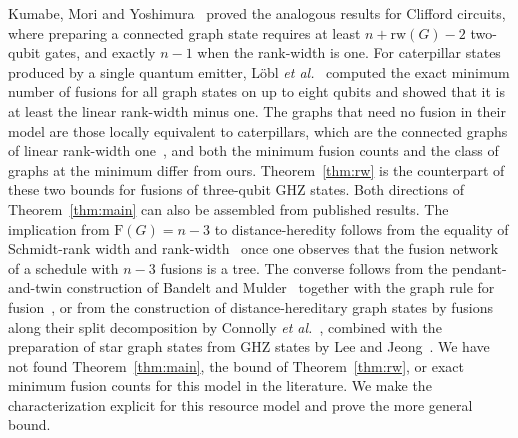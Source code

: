 \documentclass[aps,pra,onecolumn,superscriptaddress,nofootinbib,longbibliography]{revtex4-2}
\theoremstyle{plain}
\theoremstyle{remark}
\newcommand{\F}{\mathrm{F}}
\newcommand{\rw}{\mathrm{rw}}
\begin{document}
Kumabe, Mori and Yoshimura~\cite{Kumabe2026complexity} proved the analogous results for Clifford
circuits, where preparing a connected graph state requires at least $n+\rw(G)-2$ two-qubit gates, and
exactly $n-1$ when the rank-width is one. For caterpillar states produced by a single quantum emitter,
L\"obl \emph{et al.}~\cite{Lobl2025generating} computed the exact minimum number of fusions for all graph
states on up to eight qubits and showed that it is at least the linear rank-width minus one. The graphs
that need no fusion in their model are those locally equivalent to caterpillars, which are the connected
graphs of linear rank-width one~\cite{BuiXuan2013note}, and both the minimum fusion counts and the class
of graphs at the minimum differ from ours. Theorem~\ref{thm:rw} is the counterpart of these two bounds for
fusions of three-qubit GHZ states.
Both directions of Theorem~\ref{thm:main} can also be assembled from published results. The implication
from $\F(G)=n-3$ to distance-heredity follows from the equality of Schmidt-rank width and
rank-width~\cite{VandenNest2007classical} once one observes that the fusion network of a schedule with
$n-3$ fusions is a tree. The converse follows from the pendant-and-twin construction of Bandelt and
Mulder~\cite{Bandelt1986distance} together with the graph rule for fusion~\cite{Zaidi2015near,Lee2023graph},
or from the construction of distance-hereditary graph states by fusions along their split decomposition
by Connolly \emph{et al.}~\cite{Connolly2026efficient}, combined with the preparation of star graph states
from GHZ states by Lee and Jeong~\cite{Lee2023graph}. We have not found Theorem~\ref{thm:main}, the bound
of Theorem~\ref{thm:rw}, or exact minimum fusion counts for this model in the literature. We make the
characterization explicit for this resource model and prove the more general bound.
\end{document}
